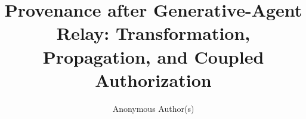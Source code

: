 \documentclass[sigconf,anonymous]{aamas}
\title[Provenance after Generative-Agent Relay]{Provenance after Generative-Agent Relay: Transformation, Propagation, and Coupled Authorization}
\author{Anonymous Author(s)}
\affiliation{\institution{Anonymous Institution}\country{Anonymous}}
\begin{document}
\maketitle











\balance


\end{document}

